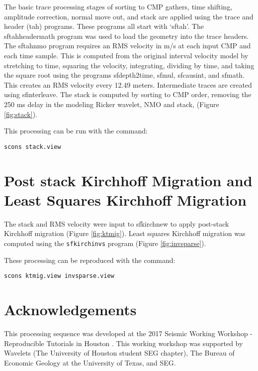 The basic trace processing stages of sorting to CMP gathers, time shifting, 
amplitude correction, normal move out, and stack are applied using the trace 
and header (tah) programs.  These programs all start with ‘sftah’.  The 
sftahheadermath program was used to load the geometry into the trace headers.  
The sftahnmo program requires an RMS velocity in m/s at each input CMP and each 
time sample.  This is computed from the original interval velocity model by 
stretching to time, squaring the velocity, integrating, dividing by time, and 
taking the square root using the programs sfdepth2time, sfmul, sfcausint, and 
sfmath.  This creates an RMS velocity every 12.49 meters.  Intermediate traces 
are created using sfinterleave.  The stack is computed by sorting to CMP order,
removing the 250 ms delay in the modeling Ricker wavelet, NMO and stack, 
(Figure \ref{fig:stack}).

This processing can be run with the command:
\begin{verbatim}
scons stack.view 
\end{verbatim}


\section{Post stack Kirchhoff Migration and Least Squares Kirchhoff Migration}

The stack and RMS velocity were input to sfkirchnew to apply post-stack
Kirchhoff migration (Figure \ref{fig:ktmig}).  Least squares Kirchhoff 
migration was computed using the \texttt{sfkirchinvs} program (Figure 
\ref{fig:invsparse}).  

These processing can be reproduced with the command:
\begin{verbatim}
scons ktmig.view invsparse.view
\end{verbatim}


\section{Acknowledgements}
This processing sequence was developed at the 2017 Seismic Working Workshop - 
Reproducible Tutorials in Houston \cite[]{schleicher}.  This working workshop 
was supported by Wavelets (The University of Houston student SEG chapter), 
The Bureau of Economic Geology at the University of Texas, and SEG.

